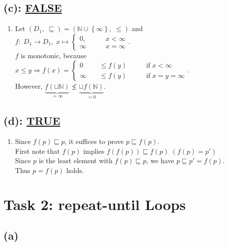 \documentclass[12pt]{scrartcl}
\begin{document}
		\subsection*{(c): \underline{FALSE}}
		\begin{enumerate}
			\item[] Let $\left(D_{1},\; \sqsubseteq\right)=\left(\mathbb{N}\cup\left\{\infty\right\},\;\leq\right)$ and\\
			$f:\;D_{1}\rightarrow D_{1},\; x\mapsto\left\{
			\begin{aligned}
				0, &\qquad x<\infty\\
				\infty &\qquad x=\infty			
			\end{aligned}\right.$.\\
			$f$ is monotonic, because $x\leq y\Rightarrow f\left(x\right)=\left\{\begin{aligned}
			0 &\quad \leq f\left(y\right) &\qquad \text{if}\; x<\infty\\
			\infty &\quad \leq f\left(y\right) &\qquad \text{if}\; x=y=\infty
			\end{aligned}\right.$.\\
			However, $\underbrace{f\left(\sqcup\mathbb{N}\right)}_{=\infty}\nleq\underbrace{\sqcup f\left(\mathbb{N}\right)}_{=0}$.
		\end{enumerate}
		
		\subsection*{(d): \underline{TRUE}}
		\begin{enumerate}
			\item[] Since $f\left(p\right)\sqsubseteq p$, it suffices to prove $p\sqsubseteq f\left(p\right)$.\\
			First note that $f\left(p\right)$ implies $f\left(f\left(p\right)\right)\sqsubseteq f\left(p\right)$ \null\hfill {\color{red}$\left(f\left(p\right)=p'\right)$}\\
			Since $p$ is the least element with $f\left(p\right)\sqsubseteq p$, we have $p\sqsubseteq p'=f\left(p\right)$.\\
			Thus $p=f\left(p\right)$ holds.
		\end{enumerate}		
	\section*{Task 2: repeat-until Loops}
	\subsection*{(a)}
	
\end{document}
